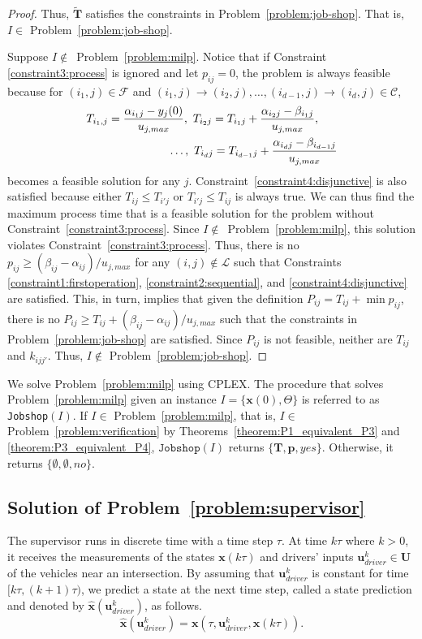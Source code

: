 \documentclass{sig-alternate}
\begin{document}
\begin{proof}
	Thus, $\tilde{\mathbf{T}}$ satisfies the constraints in Problem~\ref{problem:job-shop}. That is, $I\in$ Problem~\ref{problem:job-shop}.

	Suppose $I\notin$~Problem~\ref{problem:milp}. Notice that if Constraint \ref{constraint3:process} is ignored and let $p_{ij}=0$, the problem is always feasible because for $(i_1,j)\in\mathcal{F}$ and $(i_1,j)\rightarrow (i_2,j),\ldots, (i_{d-1},j)\rightarrow (i_d,j)\in\mathcal{C}$,
	\begin{align*}
	&T_{i_1,j}=\frac{\alpha_{i_1j}-y_j(0)}{u_{j,max}},~T_{i_2j}=T_{i_1j}+\frac{\alpha_{i_2j}-\beta_{i_1j}}{u_{j,max}},\\
	&\hspace{1 in}\ldots,~ T_{i_dj}=T_{i_{d-1}j}+\frac{\alpha_{i_dj}-\beta_{i_{d-1}j}}{u_{j,max}}
	\end{align*} becomes a feasible solution for any $j$. Constraint~\ref{constraint4:disjunctive} is also satisfied because either $T_{ij}\leq T_{i'j}$ or $T_{i'j}\leq T_{ij}$ is always true. We can thus find the maximum process time that is a feasible solution for the problem without Constraint~\ref{constraint3:process}. Since $I\notin$~Problem~\ref{problem:milp}, this solution violates Constraint~\ref{constraint3:process}. Thus, there is no $p_{ij}\geq (\beta_{ij}-\alpha_{ij})/{u_{j,max}}$ for any $(i,j)\notin\mathcal{L}$ such that Constraints \ref{constraint1:firstoperation}, \ref{constraint2:sequential}, and \ref{constraint4:disjunctive} are satisfied. This, in turn, implies that given the definition $P_{ij}=T_{ij}+\min p_{ij}$, there is no $P_{ij}\geq T_{ij}+(\beta_{ij}-\alpha_{ij})/u_{j,max}$ such that the constraints in Problem~\ref{problem:job-shop} are satisfied. Since $P_{ij}$ is not feasible, neither are $T_{ij}$ and $k_{ijj'}$. Thus, $I\notin$ Problem~\ref{problem:job-shop}.
\end{proof}

We solve Problem~\ref{problem:milp} using CPLEX. The procedure that solves Problem~\ref{problem:milp} given an instance $I=\{\mathbf{x}(0),\Theta\}$ is referred to as \texttt{Jobshop}$(I)$. If $I\in$ Problem~\ref{problem:milp}, that is, $I\in$ Problem~\ref{problem:verification} by Theorems~\ref{theorem:P1_equivalent_P3} and \ref{theorem:P3_equivalent_P4}, $\mathtt{Jobshop}(I)$ returns $\{\mathbf{T,p},yes\}$. Otherwise, it returns $\{\emptyset,\emptyset,no\}$. 

\subsection{Solution of Problem~\ref{problem:supervisor}}\label{section:supervisor}
 The supervisor runs in discrete time with a time step $\tau$. At time $k\tau$ where $k>0$, it receives the measurements of the states $\mathbf{x}(k\tau)$ and drivers' inputs $\mathbf{u}_{driver}^k\in\mathbf{U}$ of the vehicles near an intersection. By assuming that $\mathbf{u}_{driver}^k$ is constant for time $[k\tau, (k+1)\tau)$, we predict a state at the next time step, called a state prediction and denoted by $\hat{\mathbf{x}}(\mathbf{u}_{driver}^k)$, as follows.
$$\hat{\mathbf{x}}(\mathbf{u}_{driver}^k) = \mathbf{x}(\tau, \mathbf{u}_{driver}^k, \mathbf{x}(k\tau)).$$
 
\end{document}
